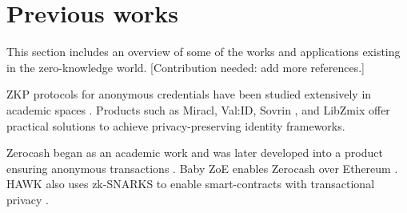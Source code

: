 \section{Previous works}
\label{apps:previous-works}

This section includes an overview of some of the works and applications existing in the zero-knowledge world. 
[Contribution needed: add more references.]



	ZKP protocols for anonymous credentials have been studied extensively in academic spaces 
\cite{2010:SCN:Solving-Revocation-with-Efficient-Update-of-Anonymous-Credentials,
			2014:architecture-for-ABC-technologies,
			2017:ccs:Practical-UC-Secure-Delegatable-Credentials-with-attributes,
			2017:SP:Accumulators-with-Applications-to-Anonymity-Preserving-Revocation,
			2018:NSDI:zkLedger}.  
Products such as Miracl, Val:ID, Sovrin \cite{2018:sovrin}, and LibZmix \cite{2019:github:libzmix} offer practical solutions to achieve privacy-preserving identity frameworks.  

Zerocash began as an academic work and was later developed into a product ensuring anonymous transactions \cite{2014:SP:Zerocash}. 
Baby ZoE enables Zerocash over Ethereum \cite{2018:github:baby-zoe}.
HAWK also uses zk-SNARKS to enable smart-contracts with transactional privacy \cite{2016:SP:Hawk}.
